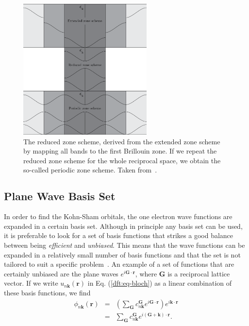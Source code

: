 \begin{refsection}
\begin{figure}[ht] 
\captionsetup{width=0.8\textwidth} 
\centering 
\includegraphics[width=0.6\textwidth]{./Figures/DFT/reduced.png} 
\caption{\label{dft:fig-reduced}The reduced zone scheme, derived from the extended 
zone scheme by mapping all bands to the first Brillouin zone. If we repeat the 
reduced zone scheme for the whole reciprocal space, we obtain the so-called 
periodic zone scheme. Taken from~\cite{Kittel2005}.} 
\end{figure} 
 
\subsection{Plane Wave Basis Set} \label{dft:sec-planewave} 
 
In order to find the Kohn-Sham orbitals, the one electron wave functions are 
expanded in a certain basis set. Although in principle any basis set can be 
used, it is preferable to look for a set of basis functions that strikes a good balance between being  
\textit{efficient} and \textit{unbiased}. This means that the wave functions 
can be expanded in a relatively small number of basis functions and that the 
set is not tailored to suit a specific problem~\cite{Cottenier2013}. An 
example of a set of functions that are certainly unbiased are the plane waves $e^{i \mathbf{G}\cdot 
\mathbf{r}}$, where $\mathbf{G}$ is a reciprocal lattice vector. If we write 
$u_{n\mathbf{k}}(\mathbf{r})$ in Eq. (\ref{dft:eq-bloch}) as a linear combination of 
these basis functions, we find 
\begin{eqnarray} 
\phi_{n\mathbf{k}}(\mathbf{r}) &=& \left( \sum_{\mathbf{G}} 
c_{n\mathbf{k}}^{\mathbf{G}}e^{i\mathbf{G}\cdot \mathbf{r}} \right) 
e^{i\mathbf{k}\cdot \mathbf{r}} 
\\ \label{dft:eq-planewaves} &=& \sum_{\mathbf{G}} 
c_{n\mathbf{k}}^{\mathbf{G}}e^{i(\mathbf{G}+\mathbf{k})\cdot \mathbf{r}}. 
\end{eqnarray} 
 

\end{refsection}
